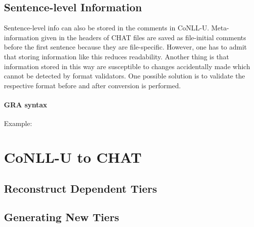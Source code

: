 \subsection{Sentence-level Information}
Sentence-level info can also be stored in the comments in CoNLL-U. Meta-information given in the headers of CHAT files are saved as file-initial comments before the first sentence because they are file-specific.
However, one has to admit that storing information like this reduces readability. Another thing is that information stored in this way are susceptible to changes accidentally made which cannot be detected by format validators. One possible solution is to validate the respective format before and after conversion is performed.


\paragraph{GRA syntax}
Example:


\section{CoNLL-U to CHAT}

\subsection{Reconstruct Dependent Tiers}

\subsection{Generating New Tiers}
